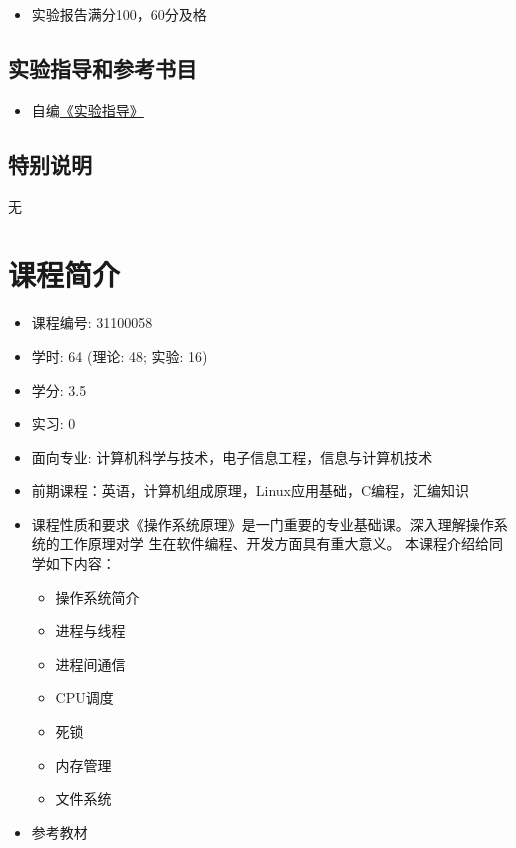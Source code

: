 \documentclass{wx672article}
\begin{document}
\begin{itemize}
\item 实验报告满分100，60分及格
\end{itemize}

\subsection{实验指导和参考书目}
\label{sec-3-7}

\begin{itemize}
\item 自编\href{http://cs2.swfu.edu.cn/~wx672/lecture_notes/os/lab.html}{《实验指导》}
\end{itemize}

\subsection{特别说明}
\label{sec-3-8}

无

\section{课程简介}
\label{sec-4}

\begin{itemize}
\item 课程编号: 31100058
\item 学时: 64 (理论: 48; 实验: 16)
\item 学分: 3.5
\item 实习: 0
\item 面向专业: 计算机科学与技术，电子信息工程，信息与计算机技术
\item 前期课程：英语，计算机组成原理，Linux应用基础，C编程，汇编知识
\item 课程性质和要求《操作系统原理》是一门重要的专业基础课。深入理解操作系统的工作原理对学
  生在软件编程、开发方面具有重大意义。 本课程介绍给同学如下内容：
  \begin{itemize}
  \item 操作系统简介
  \item 进程与线程
  \item 进程间通信
  \item CPU调度
  \item 死锁
  \item 内存管理
  \item 文件系统
  \end{itemize}
\item 参考教材\hfill
  \nocite{silberschatz11essentials,tanenbaum2008modern,bovet2005understanding}
  \printbibliography[heading=none]{}
  
\end{itemize}



%  
\end{document}
